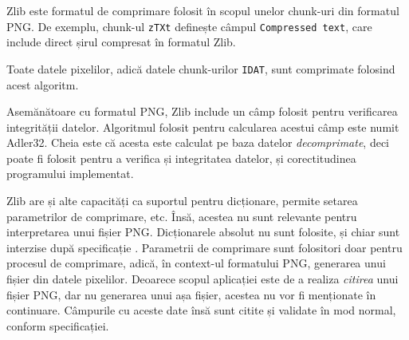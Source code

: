 \documentclass[a4paper,12pt]{report}
\begin{document}
Zlib este formatul de comprimare folosit în scopul unelor chunk-uri din formatul \ac{PNG}.
De exemplu, chunk-ul \texttt{zTXt} definește câmpul \texttt{Compressed text},
care include direct șirul compresat în formatul Zlib.

Toate datele pixelilor, adică datele chunk-urilor \texttt{IDAT}, sunt comprimate folosind acest algoritm.

Asemănătoare cu formatul \ac{PNG}, Zlib include un câmp folosit pentru verificarea integrității datelor.
Algoritmul folosit pentru calcularea acestui câmp este numit Adler32.
Cheia este că acesta este calculat pe baza datelor \textit{decomprimate},
deci poate fi folosit pentru a verifica și integritatea datelor, și corectitudinea programului implementat.

Zlib are și alte capacități ca suportul pentru dicționare, permite setarea parametrilor de comprimare, etc.
Însă, acestea nu sunt relevante pentru interpretarea unui fișier \ac{PNG}.
Dicționarele absolut nu sunt folosite, și chiar sunt interzise după specificație \cite{png_spec_chapter_deflate}.
Parametrii de comprimare sunt folositori doar pentru procesul de comprimare,
adică, în context-ul formatului \ac{PNG}, generarea unui fișier din datele pixelilor.
Deoarece scopul aplicației este de a realiza \textit{citirea} unui fișier \ac{PNG},
dar nu generarea unui așa fișier, acestea nu vor fi menționate în continuare.
Câmpurile cu aceste date însă sunt citite și validate în mod normal, conform specificației.









\newpage
{}





\appendix

\renewcommand{\thechapter}{\arabic{chapter}}


\setcounter{chapter}{1}

\end{document}
